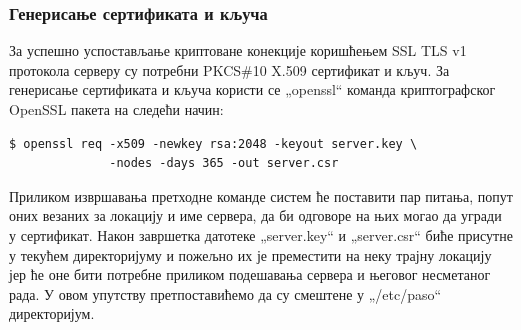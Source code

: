 \documentclass[a4paper, 12pt, diplomski]{etfcyr}
\def\quote#1{„#1“}
\begin{document}
					\subsubsection*{Генерисање сертификата и кључа}
						\begin{justify}
							За успешно успостављање криптоване конекције коришћењем SSL TLS v1 протокола серверу су потребни PKCS\#10 X.509 сертификат и кључ. За генерисање сертификата и кључа користи се \quote{openssl} команда криптографског OpenSSL пакета на следећи начин:
							\begin{footnotesize}
								\begin{verbatim}
$ openssl req -x509 -newkey rsa:2048 -keyout server.key \
              -nodes -days 365 -out server.csr
								\end{verbatim}
							\end{footnotesize}
							Приликом извршавања претходне команде систем ће поставити пар питања, попут оних везаних за локацију и име сервера, да би одговоре на њих могао да угради у сертификат. Након завршетка датотеке \quote{server.key} и \quote{server.csr} биће присутне у текућем директоријуму и пожељно их је преместити на неку трајну локацију јер ће оне бити потребне приликом подешавања сервера и његовог несметаног рада. У овом упутству претпоставићемо да су смештене у \quote{/etc/paso} директоријум.
						\end{justify}

					\newpage
\end{document}
